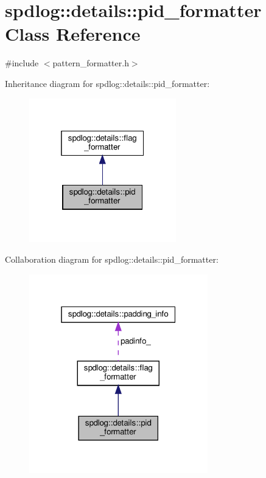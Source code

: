 \hypertarget{classspdlog_1_1details_1_1pid__formatter}{}\section{spdlog\+:\+:details\+:\+:pid\+\_\+formatter Class Reference}
\label{classspdlog_1_1details_1_1pid__formatter}


{\ttfamily \#include $<$pattern\+\_\+formatter.\+h$>$}



Inheritance diagram for spdlog\+:\+:details\+:\+:pid\+\_\+formatter\+:
\nopagebreak
\begin{figure}[H]
\begin{center}
\leavevmode
\includegraphics[width=181pt]{classspdlog_1_1details_1_1pid__formatter__inherit__graph}
\end{center}
\end{figure}


Collaboration diagram for spdlog\+:\+:details\+:\+:pid\+\_\+formatter\+:
\nopagebreak
\begin{figure}[H]
\begin{center}
\leavevmode
\includegraphics[width=220pt]{classspdlog_1_1details_1_1pid__formatter__coll__graph}
\end{center}
\end{figure}
